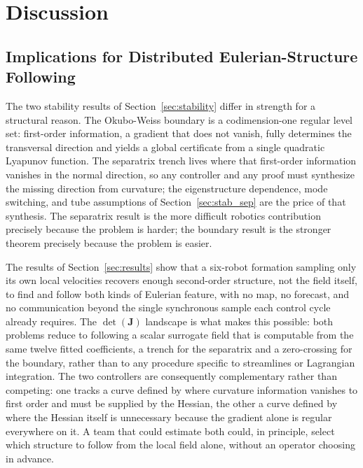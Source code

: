 \documentclass[lettersize,journal]{IEEEtran}
\begin{document}
\section{Discussion}
\label{sec:discussion}

\subsection{Implications for Distributed Eulerian-Structure Following}

The two stability results of Section~\ref{sec:stability} differ in
strength for a structural reason. The Okubo-Weiss boundary is a
codimension-one regular level set: first-order information, a gradient
that does not vanish, fully determines the transversal direction and
yields a global certificate from a single quadratic Lyapunov function.
The separatrix trench lives where that first-order information vanishes
in the normal direction, so any controller and any proof must
synthesize the missing direction from curvature; the eigenstructure
dependence, mode switching, and tube assumptions of
Section~\ref{sec:stab_sep} are the price of that synthesis. The
separatrix result is the more difficult robotics contribution precisely
because the problem is harder; the boundary result is the stronger
theorem precisely because the problem is easier.

The results of Section~\ref{sec:results} show that a six-robot formation
sampling only its own local velocities recovers enough second-order
structure, not the field itself, to find and follow both kinds of
Eulerian feature, with no map, no forecast, and no communication beyond
the single synchronous sample each control cycle already requires. The
$\det(\mathbf{J})$ landscape is what makes this possible: both problems
reduce to following a scalar surrogate field that is computable from
the same twelve fitted coefficients, a trench for the separatrix and a
zero-crossing for the boundary, rather than to any procedure specific
to streamlines or Lagrangian integration. The two controllers are
consequently complementary rather than competing: one tracks a curve
defined by where curvature information vanishes to first order and must
be supplied by the Hessian, the other a curve defined by where the
Hessian itself is unnecessary because the gradient alone is regular
everywhere on it. A team that could estimate both could, in principle,
select which structure to follow from the local field alone, without an
operator choosing in advance.
\end{document}
